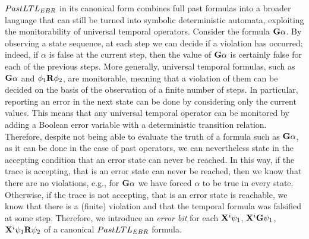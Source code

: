 $Past\ebrltl$ in its canonical form combines full past formulas into a broader language that can still be turned into symbolic deterministic automata, exploiting the monitorability of universal temporal operators.
Consider the formula $\ltlG{\alpha}$. By observing a state sequence, at each step we can decide if a violation has occurred; indeed, if $\alpha$ is false at the current step, then the value of $\ltlG{\alpha}$ is certainly false for each of the previous steps. More generally, universal temporal formulas, such as $\ltlG{\alpha}$ and $\ltlR{\phi_1}{\phi_2}$, are monitorable, meaning that a violation of them can be decided on the basis of the observation of a finite number of steps. 
In particular, reporting an error in the next state can be done by considering only the current values. This means that any universal temporal operator can be monitored by adding a Boolean error variable with a deterministic transition relation. 
Therefore, despite not being able to evaluate the truth of a formula such as $\ltlG{\alpha}$, as it can be done in the case of past operators, we can nevertheless state in the accepting condition that an error state can never be reached. 
In this way, if the trace is accepting, that is an error state can never be reached, then we know that there are no violations, e.g., for $\ltlG{\alpha}$ we have forced $\alpha$ to be true in every state. 
Otherwise, if the trace is not accepting, that is an error state is reachable, we know that there is a (finite) violation and that the temporal formula was falsified at some step.
Therefore, we introduce an \textit{error bit} for each $\ltlXexp{\psi_1}{i}$, $\ltlXexp{\ltlG{\psi_1}}{i}$, $\ltlXexp{\ltlR{\psi_1}{\psi_2}}{i}$ of a canonical $Past\ebrltl$ formula.

